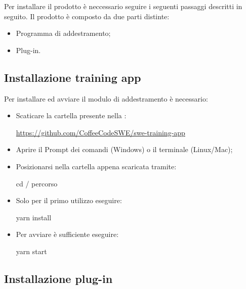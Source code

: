 \documentclass[../manuale-utente.tex]{subfiles}
\begin{document}
Per installare il prodotto è neccessario seguire i seguenti passaggi descritti in seguito. Il prodotto è composto da due parti distinte:
\begin{itemize}
  \item Programma di addestramento;
  \item Plug-in.
\end{itemize}

\subsection{Installazione training app}
\label{subs:installazione-training-app}
Per installare ed avviare il modulo di addestramento è necessario:
\begin{itemize}
  \item Scaticare la cartella presente nella : \\
  \centerline{\url{https://github.com/CoffeeCodeSWE/swe-training-app}}
  \item Aprire il Prompt dei comandi (Windows) o il terminale (Linux/Mac);
  \item Posizionarsi nella cartella appena scaricata tramite: \\
  \centerline{cd / percorso}
  \item Solo per il primo utilizzo eseguire: \\
  \centerline{yarn install}
  \item Per avviare è sufficiente eseguire: \\
  \centerline{yarn start}
\end{itemize}

\subsection{Installazione plug-in}%
\label{subs:installazione-plug-in}
\end{document}

